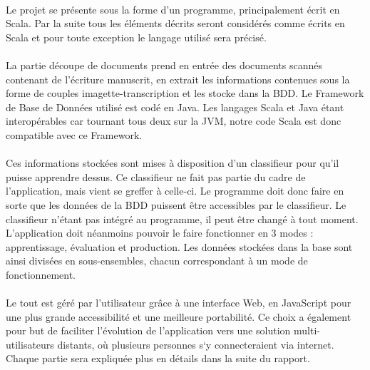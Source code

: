 \paragraph{}

Le projet se présente sous la forme d’un programme, principalement écrit en Scala. Par la suite tous les éléments décrits seront considérés comme écrits en Scala et pour toute exception le langage utilisé sera précisé.

\paragraph{}

La partie découpe de documents prend en entrée des documents scannés contenant de l’écriture manuscrit, en extrait les informations contenues sous la forme de couples imagette-transcription et les stocke dans la BDD.
Le Framework de Base de Données utilisé est codé en Java. Les langages Scala et Java étant interopérables car tournant tous deux sur la JVM, notre code Scala est donc compatible avec ce Framework.

\paragraph{}

Ces informations stockées sont mises à disposition d’un classifieur pour qu’il puisse apprendre dessus. Ce classifieur ne fait pas partie du cadre de l’application, mais vient se greffer à celle-ci. Le programme doit donc faire en sorte que les données de la BDD puissent être accessibles par le classifieur. Le classifieur n’étant pas intégré au programme, il peut être changé à tout moment. L’application doit néanmoins pouvoir le faire fonctionner en 3 modes : apprentissage, évaluation et production.
Les données stockées dans la base sont ainsi divisées en sous-ensembles, chacun correspondant à un mode de fonctionnement.

\paragraph{}

Le tout est géré par l’utilisateur grâce à une interface Web, en JavaScript pour une plus grande accessibilité et une meilleure portabilité. Ce choix a également pour but de faciliter l’évolution de l’application vers une solution multi-utilisateurs distants, où plusieurs personnes s‘y connecteraient via internet.
Chaque partie sera expliquée plus en détails dans la suite du rapport.

